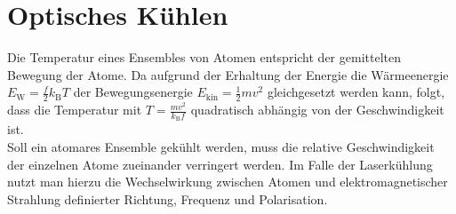 \documentclass[
class=book,
accentcolor=1b,
custommargins=geometry,
fontsize=11pt,
thesis={type=Versuchsanleitung},
ruledheaders=all,
headline=false,
instbox=false,
marginpar=false,
title=small,
ignore-missing-data=true,
twoside=false,
logofile=apqdesign/tuda_logo.pdf,
pdfa=false %
]{apqpub}
\begin{document}
				\section{Optisches Kühlen}			
				Die Temperatur eines Ensembles von Atomen entspricht der gemittelten Bewegung der Atome. 
				Da aufgrund der	Erhaltung der Energie die Wärmeenergie $E_{\text{W}} = \frac{f}{2}k_{\text{B}}T$ der Bewegungsenergie $E_{\text{kin}} = \frac{1}{2}mv^2$ gleichgesetzt werden kann, folgt, dass die Temperatur mit $T = \frac{mv^2}{k_{\text{B}} f}$ quadratisch abhängig von der Geschwindigkeit ist.\\ 
				Soll ein atomares Ensemble gekühlt werden, muss die relative Geschwindigkeit der einzelnen Atome zueinander	verringert werden. 
				Im Falle der Laserkühlung nutzt man hierzu die Wechselwirkung zwischen Atomen und elektromagnetischer Strahlung definierter Richtung, Frequenz und Polarisation.
				
\end{document}
